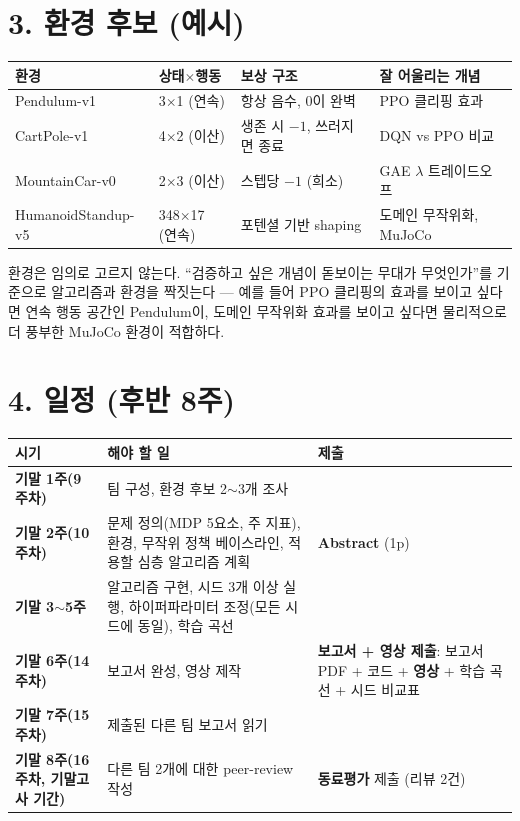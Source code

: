 \documentclass[12pt]{article}
\begin{document}
\section*{3. 환경 후보 (예시)}
\begin{center}
\small
\begin{tabular}{@{}lllp{4.2cm}@{}}
\toprule
환경 & 상태$\times$행동 & 보상 구조 & 잘 어울리는 개념 \\
\midrule
Pendulum-v1 & 3$\times$1 (연속) & 항상 음수, 0이 완벽 & PPO 클리핑 효과 \\
CartPole-v1 & 4$\times$2 (이산) & 생존 시 $-1$, 쓰러지면 종료 & DQN vs PPO 비교 \\
MountainCar-v0 & 2$\times$3 (이산) & 스텝당 $-1$ (희소) & GAE $\lambda$ 트레이드오프 \\
HumanoidStandup-v5 & 348$\times$17 (연속) & 포텐셜 기반 shaping & 도메인 무작위화, MuJoCo \\
\bottomrule
\end{tabular}
\end{center}
\vspace{4pt}
환경은 임의로 고르지 않는다. ``검증하고 싶은 개념이 돋보이는 무대가
무엇인가''를 기준으로 알고리즘과 환경을 짝짓는다 --- 예를 들어 PPO
클리핑의 효과를 보이고 싶다면 연속 행동 공간인 Pendulum이, 도메인
무작위화 효과를 보이고 싶다면 물리적으로 더 풍부한 MuJoCo 환경이
적합하다.

\section*{4. 일정 (후반 8주)}
\begin{center}
\small
\begin{tabular}{@{}p{3.6cm}p{5.4cm}p{3.7cm}@{}}
\toprule
\textbf{시기} & \textbf{해야 할 일} & \textbf{제출} \\
\midrule
\textbf{기말 1주(9주차)} & 팀 구성, 환경 후보 2$\sim$3개 조사 &  \\
\textbf{기말 2주(10주차)} & 문제 정의(MDP 5요소, 주 지표), 환경, 무작위 정책 베이스라인, 적용할 심층 알고리즘 계획 & \textbf{Abstract} (1p) \\
\textbf{기말 3$\sim$5주} & 알고리즘 구현, 시드 3개 이상 실행, 하이퍼파라미터 조정(모든 시드에 동일), 학습 곡선 &  \\
\textbf{기말 6주(14주차)} & 보고서 완성, 영상 제작 & \textbf{보고서 + 영상 제출}: 보고서 PDF + 코드 + \textbf{영상} + 학습 곡선 + 시드 비교표 \\
\textbf{기말 7주(15주차)} & 제출된 다른 팀 보고서 읽기 &  \\
\textbf{기말 8주(16주차, 기말고사 기간)} & 다른 팀 2개에 대한 peer-review 작성 & \textbf{동료평가} 제출 (리뷰 2건) \\
\bottomrule
\end{tabular}
\end{center}
\end{document}
